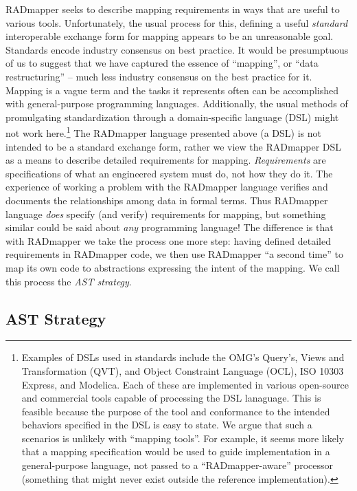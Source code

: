 \documentclass[9pt,letterpaper]{article}
\begin{document}
RADmapper seeks to describe mapping requirements in ways that are useful to various tools.
Unfortunately, the usual process for this, defining a useful \textit{standard} interoperable exchange form for mapping appears to be an unreasonable goal.
Standards encode industry consensus on best practice.
It would be presumptuous of us to suggest that we have captured the essence of ``mapping'', or ``data restructuring'' -- much less industry consensus on the best practice for it.
Mapping is a vague term and the tasks it represents often can be accomplished with general-purpose programming languages.
Additionally, the usual methods of promulgating standardization through a domain-specific language (DSL) might not work here.\footnote{Examples of DSLs used in standards include the OMG's Query's, Views and Transformation (QVT), and Object Constraint Language (OCL), ISO 10303 Express, and Modelica. Each of these are implemented in various open-source and commercial tools capable of processing the DSL lanaguage.
  This is feasible because the purpose of the tool and conformance to the intended behaviors specified in the DSL is easy to state.
  We argue that such a scenarios is unlikely with ``mapping tools''.
  For example, it seems more likely that a mapping specification would be used to guide implementation in a general-purpose language,
  not passed to a ``RADmapper-aware'' processor (something that might never exist outside the reference implementation).}
The RADmapper language presented above (a DSL) is not intended to be a standard exchange form, rather we view the RADmapper DSL as a means to describe detailed requirements for mapping.
\textit{Requirements} are specifications of what an engineered system must do, not how they do it.
The experience of working a problem with the RADmapper language verifies and documents the relationships among data in formal terms.
Thus RADmapper language \textit{does} specify (and verify) requirements for mapping, but something similar could be said about \textit{any} programming language!
The difference is that with RADmapper we take the process one more step: having defined detailed requirements in RADmapper code, we then use RADmapper ``a second time'' to map its own code to abstractions expressing the intent of the mapping.
We call this process the \textit{AST strategy}.

\subsection{AST Strategy}
\end{document}
